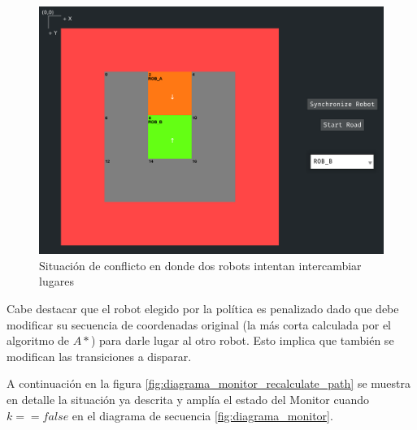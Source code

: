 \begin{figure}[H]
    \centering
    \includegraphics[trim={1.6cm 0.3cm 0 1.5cm}, clip, width=0.7\linewidth]{images/conflicto_path.png}
    \caption{Situación de conflicto en donde dos robots intentan intercambiar lugares}
    \label{fig:conflicto_path}
\end{figure}

Cabe destacar que el robot elegido por la política es penalizado dado que debe modificar su secuencia de coordenadas original (la más corta calculada por el algoritmo de $A*$) para darle lugar al otro robot. Esto implica que también se modifican las transiciones a disparar.

A continuación en la figura \ref{fig:diagrama_monitor_recalculate_path} se muestra en detalle la situación ya descrita y amplía el estado del Monitor cuando $k == false$ en el diagrama de secuencia \ref{fig:diagrama_monitor}.

